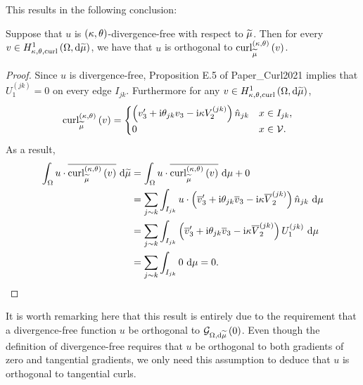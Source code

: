 \documentclass[11pt]{report}
\renewcommand{\ktcurl}[1]{\mathrm{curl}^{\kt}_{\dddmes}\bracs{#1}}
\begin{document}
This results in the following conclusion:
\begin{prop}
	Suppose that $u$ is $\left( \kappa, \theta \right)$-divergence-free with respect to $\widetilde{\mu}$.
	Then for every $v\in H^1_{\kappa,\theta,\mathrm{curl}}\left( \Omega, \mathrm{d}\widetilde{\mu} \right)$, we have that $u$ is orthogonal to $\ktcurl{v}$.
\end{prop}
\begin{proof}
	Since $u$ is divergence-free, Proposition E.5 of Paper\_Curl2021 implies that $U^{(jk)}_1=0$ on every edge $I_{jk}$.
	Furthermore for any $v\in H^1_{\kappa,\theta,\mathrm{curl}}\left( \Omega, \mathrm{d}\widetilde{\mu} \right)$, 
	\begin{align*}
		\ktcurl{v} &= 
		\begin{cases} 
			\bracs{v_3' +\rmi\qm_{jk} v_3 - \rmi\wavenumber V_2^{(jk)}}\hat{n}_{jk} & x\in I_{jk}, \\
			0 & x\in\vertSet.
		\end{cases}
	\end{align*}
	As a result,
	\begin{align*}
		\integral{\ddom}{ u\cdot\overline{\ktcurl{v}} }{\dddmes}
		&= \integral{\ddom}{u\cdot\overline{\ktcurl{v}} }{\ddmes} + 0 \\
		&= \sum_{j\con k}\integral{I_{jk}}{ u\cdot\bracs{\overline{v}_3' +\rmi\qm_{jk} \overline{v}_3 - \rmi\wavenumber\overline{V}_2^{(jk)}}\hat{n}_{jk} }{\ddmes} \\
		&= \sum_{j\con k}\integral{I_{jk}}{ \bracs{\overline{v}_3' +\rmi\qm_{jk} \overline{v}_3 - \rmi\wavenumber\overline{V}_2^{(jk)}}U_1^{(jk)} }{\ddmes} \\
		&= \sum_{j\con k}\integral{I_{jk}}{ 0 }{\ddmes} = 0.
	\end{align*}
\end{proof}
It is worth remarking here that this result is entirely due to the requirement that a divergence-free function $u$ be orthogonal to $\mathcal{G}_{ \Omega, \mathrm{d}\widetilde{\mu}}\left( 0 \right)$.
Even though the definition of divergence-free requires that $u$ be orthogonal to both gradients of zero and tangential gradients, we only need this assumption to deduce that $u$ is orthogonal to tangential curls.
\end{document}
